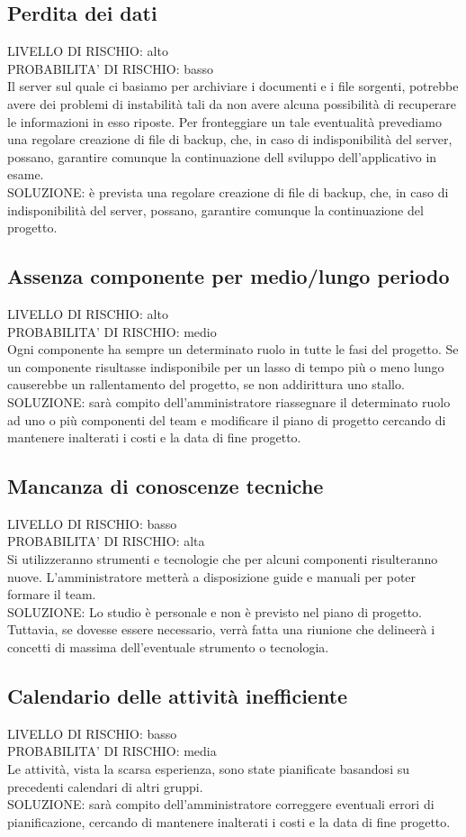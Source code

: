 \documentclass[11pt,a4paper]{article}
\begin{document}
\subsection{Perdita dei dati}
LIVELLO DI RISCHIO: alto \\
PROBABILITA' DI RISCHIO: basso \\
Il server sul quale ci basiamo per archiviare i documenti e i file sorgenti, potrebbe avere dei problemi di instabilità tali da non avere alcuna possibilità di recuperare le informazioni in esso riposte.
Per fronteggiare un tale eventualità prevediamo una regolare creazione di file di backup, che, in caso di indisponibilità del server, possano, garantire comunque la continuazione dell sviluppo dell'applicativo in esame. \\
SOLUZIONE: è prevista una regolare creazione di file di backup, che, in caso di indisponibilità del server, possano, garantire comunque la continuazione del progetto.
\subsection{Assenza componente per medio/lungo periodo}
LIVELLO DI RISCHIO: alto \\
PROBABILITA' DI RISCHIO: medio \\
Ogni componente ha sempre un determinato ruolo in tutte le fasi del progetto.
Se un componente risultasse indisponibile per un lasso di tempo più o meno lungo causerebbe un rallentamento del progetto, se non addirittura uno stallo. \\
SOLUZIONE: sarà compito dell'amministratore riassegnare il determinato ruolo ad uno o più componenti del team e modificare il piano di progetto cercando di mantenere inalterati i costi e la data di fine progetto.
\subsection{Mancanza di conoscenze tecniche}
LIVELLO DI RISCHIO: basso \\
PROBABILITA' DI RISCHIO: alta \\
Si utilizzeranno strumenti e tecnologie che per alcuni componenti risulteranno nuove.
L'amministratore metterà a disposizione guide e manuali per poter formare il team. \\
SOLUZIONE: Lo studio è personale e non è previsto nel piano di progetto.
Tuttavia, se dovesse essere necessario, verrà fatta una riunione che delineerà i concetti di massima dell'eventuale strumento o tecnologia.
\subsection{Calendario delle attività inefficiente}
LIVELLO DI RISCHIO: basso \\
PROBABILITA' DI RISCHIO: media \\
Le attività, vista la scarsa esperienza, sono state pianificate basandosi su precedenti calendari di altri gruppi. \\
SOLUZIONE: sarà compito dell'amministratore correggere eventuali errori di pianificazione, cercando di mantenere inalterati i costi e la data di fine progetto.
\end{document}
